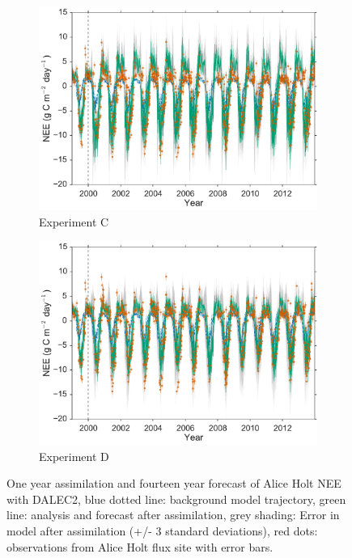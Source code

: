 \begin{figure}
\begin{subfigure}[b]{0.49\textwidth}
        \includegraphics[width=\textwidth]{chapter/chapter6/C4dvar2.pdf}
        \caption{Experiment C}
        \label{chap6:fig:4dvarBcorR}
    \end{subfigure}
    \begin{subfigure}[b]{0.49\textwidth}
        \includegraphics[width=\textwidth]{chapter/chapter6/D4dvar2.pdf}
        \caption{Experiment D}
        \label{chap6:fig:4dvaredcBcorR}
    \end{subfigure}
    \caption{One year assimilation and fourteen year forecast of Alice Holt NEE with DALEC2, blue dotted line: background model trajectory, green line: analysis and forecast after assimilation, grey shading: Error in model after assimilation (+/- 3 standard deviations), red dots: observations from Alice Holt flux site with error bars.}\label{chap6:fig:4dvar}
\end{figure}


